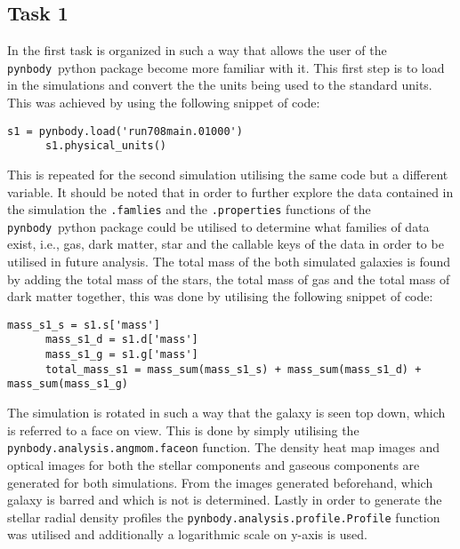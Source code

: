 \documentclass[12pt, a4paper]{article}
\begin{document}
  \subsection*{Task 1}
    In the first task is organized in such a way that allows the user of the \lstinline[language=iPython]{pynbody}~python package become more familiar with it. This first step is to load in the simulations and convert the the units being used to the standard units. This was achieved by using the following snippet of code:
    \begin{lstlisting}[language=iPython]
      s1 = pynbody.load('run708main.01000')
      s1.physical_units() 
    \end{lstlisting}
    This is repeated for the second simulation utilising the same code but a different variable. It should be noted that in order to further explore the data contained in the simulation the \lstinline[language=iPython]{.famlies} and the \lstinline[language=iPython]{.properties} functions of the \lstinline[language=iPython]{pynbody}~python package could be utilised to determine what families of data exist, i.e., gas, dark matter, star and the callable keys of the data in order to be utilised in future analysis. The total mass of the both simulated galaxies is found by adding the total mass of the stars, the total mass of gas and the total mass of dark matter together, this was done by utilising the following snippet of code:
    \begin{lstlisting}[language=iPython]
      mass_s1_s = s1.s['mass']
      mass_s1_d = s1.d['mass']
      mass_s1_g = s1.g['mass']
      total_mass_s1 = mass_sum(mass_s1_s) + mass_sum(mass_s1_d) + mass_sum(mass_s1_g)
    \end{lstlisting}
    The simulation is rotated in such a way that the galaxy is seen top down, which is referred to a face on view. This is done by simply utilising the \lstinline[language=iPython]{pynbody.analysis.angmom.faceon} function. The density heat map images and optical images for both the stellar components and gaseous components are generated for both simulations. From the images generated beforehand, which galaxy is barred and which is not is determined. Lastly in order to generate the stellar radial density profiles the \lstinline[language=iPython]{pynbody.analysis.profile.Profile} function was utilised and additionally a logarithmic scale on y-axis is used.
\end{document}
